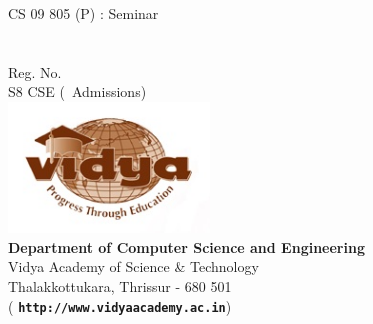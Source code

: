 %
%
\begin{titlepage}
\newcommand{\HRule}{\rule{\linewidth}{0.5mm}}
\begin{center}
{\large \sffamily CS 09 805 (P) : Seminar}\\[1cm]
{ \huge\sffamily \bfseries \vtitle}\\[5.9cm]
{\Large \sffamily \bfseries \vauthor}\\
{\large \sf  Reg. No. \vregisternumber\\ 
S8 CSE (\vadmissionyear\  Admissions)} \\[4cm] 
\includegraphics[width=0.40\textwidth]{VidyaLogo}\\[0.2cm]
{\Large \sffamily \bfseries Department of Computer Science and Engineering}\\ {\large \sffamily Vidya Academy of Science \& Technology\\ \normalsize Thalakkottukara, Thrissur - 680 501}\\
({ \bf \tt http://www.vidyaacademy.ac.in})\\[1cm]
\end{center}
\end{titlepage}
%
%